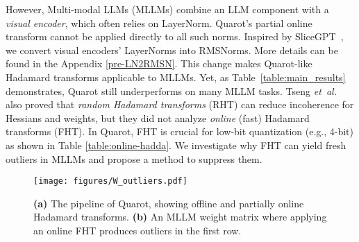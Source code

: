 However, Multi-modal LLMs (MLLMs) combine an LLM component with a \emph{visual encoder}, which often relies on LayerNorm. Quarot’s partial online transform cannot be applied directly to all such norms. Inspired by SliceGPT~\citep{ashkboos2024slicegpt}, we convert visual encoders’ LayerNorms into RMSNorms. More
details can be found in the Appendix \ref{pre-LN2RMSN}. This change makes Quarot-like Hadamard transforms applicable to MLLMs. Yet, as Table~\ref{table:main_results} demonstrates, Quarot still underperforms on many MLLM tasks. Tseng \emph{et~al.}~\citep{tseng2024quip+} also proved that \emph{random Hadamard transforms} (RHT) can reduce incoherence for Hessians and weights, but they did not analyze \emph{online} (fast) Hadamard transforms (FHT). In Quarot, FHT is crucial for low-bit quantization (e.g., 4-bit) as shown in Table \ref{table:online-hadda}. We investigate why FHT can yield fresh outliers in MLLMs and propose a method to suppress them.

\begin{figure}[ht]
    \centering    
    \texttt{[image: figures/W\_outliers.pdf]}
    \vspace{-1mm}
    \caption{\textbf{(a)} The pipeline of Quarot, showing offline and partially online Hadamard transforms. 
             \textbf{(b)} An MLLM weight matrix where applying an online FHT produces outliers in the first row.}
    \label{quarot}
    \vspace{-2mm}
\end{figure}


